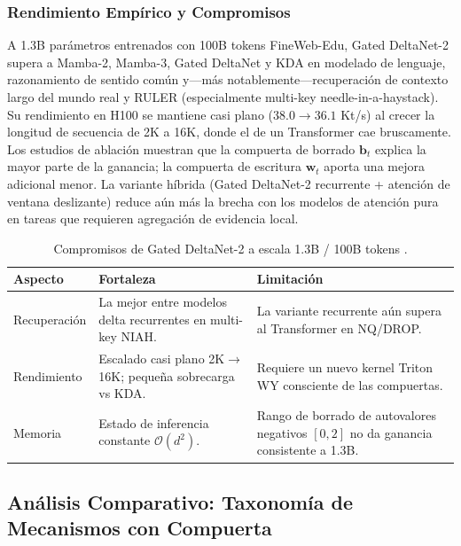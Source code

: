 \documentclass[11pt,a4paper]{article}
\begin{document}
\subsubsection{Rendimiento Empírico y Compromisos}

A 1.3B parámetros entrenados con 100B tokens FineWeb-Edu, Gated DeltaNet-2 supera a Mamba-2, Mamba-3, Gated DeltaNet y KDA en modelado de lenguaje, razonamiento de sentido común y---más notablemente---recuperación de contexto largo del mundo real y RULER (especialmente multi-key needle-in-a-haystack). Su rendimiento en H100 se mantiene casi plano ($38.0 \to 36.1$ Kt/s) al crecer la longitud de secuencia de 2K a 16K, donde el de un Transformer cae bruscamente. Los estudios de ablación muestran que la compuerta de borrado $\mathbf{b}_t$ explica la mayor parte de la ganancia; la compuerta de escritura $\mathbf{w}_t$ aporta una mejora adicional menor. La variante híbrida (Gated DeltaNet-2 recurrente + atención de ventana deslizante) reduce aún más la brecha con los modelos de atención pura en tareas que requieren agregación de evidencia local.

\begin{table}[H]
\centering
\footnotesize
\begin{tabularx}{\linewidth}{lXX}
\toprule
\textbf{Aspecto} & \textbf{Fortaleza} & \textbf{Limitación} \\
\midrule
Recuperación & La mejor entre modelos delta recurrentes en multi-key NIAH. & La variante recurrente aún supera al Transformer en NQ/DROP. \\
Rendimiento & Escalado casi plano 2K$\to$16K; pequeña sobrecarga vs KDA. & Requiere un nuevo kernel Triton WY consciente de las compuertas. \\
Memoria & Estado de inferencia constante $\mathcal{O}(d^2)$. & Rango de borrado de autovalores negativos $[0,2]$ no da ganancia consistente a 1.3B. \\
\bottomrule
\end{tabularx}
\caption{Compromisos de Gated DeltaNet-2 a escala 1.3B / 100B tokens \citep{hatamizadeh_gated_deltanet2_2026}.}
\label{tab:gated-deltanet2-tradeoffs-es}
\end{table}

\normalsize

\subsection{Análisis Comparativo: Taxonomía de Mecanismos con Compuerta}
\end{document}
